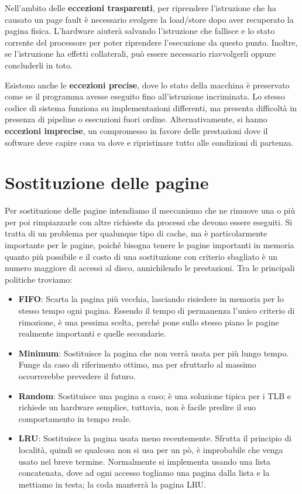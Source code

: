 \noindent Nell'ambito delle \textbf{eccezioni trasparenti}, per riprendere l'istruzione che ha causato un page fault è necessario svolgere la load/store
dopo aver recuperato la pagina fisica. L'hardware aiuterà salvando l'istruzione che fallisce e lo stato corrente del processore per poter riprendere
l'esecuzione da questo punto. Inoltre, se l'istruzione ha effetti collaterali, può essere necessario riavvolgerli oppure concluderli in toto.\par
Esistono anche le \textbf{eccezioni precise}, dove lo stato della macchina è preservato come se il programma avesse eseguito fino all'istruzione
incriminata. Lo stesso codice di sistema funziona su implementazioni differenti, ma presenta difficoltà in presenza di pipeline o esecuzioni fuori
ordine. Alternativamente, si hanno \textbf{eccezioni imprecise}, un compromesso in favore delle prestazioni dove il software deve capire cosa va dove
e ripristinare tutto alle condizioni di partenza.

%

\section{Sostituzione delle pagine}
Per sostituzione delle pagine intendiamo il meccanismo che ne rimuove una o più per poi rimpiazzarle con altre richieste da processi che devono essere
eseguiti. Si tratta di un problema per qualunque tipo di cache, ma è particolarmente importante per le pagine, poiché bisogna tenere le pagine
importanti in memoria quanto più possibile e il costo di una sostituzione con criterio sbagliato è un numero maggiore di accessi al disco, annichilendo
le prestazioni. Tra le principali politiche troviamo: \begin{itemize}
    \item \textbf{FIFO}: Scarta la pagina più vecchia, lasciando risiedere in memoria per lo stesso tempo ogni pagina. Essendo il tempo di permanenza
    l'unico criterio di rimozione, è una pessima scelta, perché pone sullo stesso piano le pagine realmente importanti e quelle secondarie.
    \item \textbf{Minimum}: Sostituisce la pagina che non verrà usata per più lungo tempo. Funge da caso di riferimento ottimo, ma per sfruttarlo al
    massimo occorrerebbe prevedere il futuro.
    \item \textbf{Random}: Sostituisce una pagina a caso; è una soluzione tipica per i TLB e richiede un hardware semplice, tuttavia, non è facile
    predire il suo comportamento in tempo reale.
    \item \textbf{LRU}: Sostituisce la pagina usata meno recentemente. Sfrutta il principio di località, quindi se qualcosa non si usa per un pò, è
    improbabile che venga usato nel breve termine. Normalmente si implementa usando una lista concatenata, dove ad ogni accesso togliamo una pagina
    dalla lista e la mettiamo in testa; la coda manterrà la pagina LRU.
\end{itemize}

